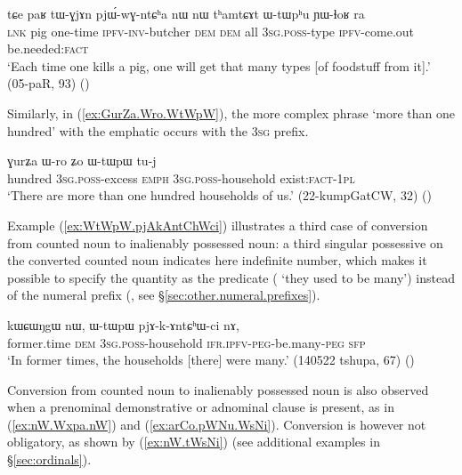 \begin{exe}
\ex \label{ex:nW.thamtCAt.WtWphu}
\gll tɕe paʁ tɯ-ɣjɤn pjɯ́-wɣ-ntɕʰa nɯ nɯ tʰamtɕɤt ɯ-tɯpʰu ɲɯ-ɬoʁ ra \\ 
 \textsc{lnk} pig one-time \textsc{ipfv}-\textsc{inv}-butcher \textsc{dem} \textsc{dem} all \textsc{3sg}.\textsc{poss}-type \textsc{ipfv}-come.out be.needed:\textsc{fact} \\
\glt `Each time one kills a pig, one will get that many types [of foodstuff from it].' (05-paR, 93)
()
\end{exe}

Similarly, in (\ref{ex:GurZa.Wro.WtWpW}), the more complex phrase  `more than one hundred' with the emphatic  occurs with the \textsc{3sg} prefix.

\begin{exe}
\ex \label{ex:GurZa.Wro.WtWpW}
\gll ɣurʑa ɯ-ro ʑo ɯ-tɯpɯ tu-j \\
 hundred \textsc{3sg}.\textsc{poss}-excess \textsc{emph} \textsc{3sg}.\textsc{poss}-household exist:\textsc{fact}-\textsc{1pl} \\
\glt `There are more than one hundred households of us.' (22-kumpGatCW, 32)
()
\end{exe}

Example (\ref{ex:WtWpW.pjAkAntChWci}) illustrates a third case of conversion from counted noun to inalienably possessed noun: a third singular possessive on the converted counted noun indicates here indefinite number, which makes it possible to specify the quantity as the predicate ( `they used to be many') instead of the numeral prefix (, see §\ref{sec:other.numeral.prefixes}).

\begin{exe}
\ex \label{ex:WtWpW.pjAkAntChWci}
\gll kɯɕɯŋgɯ nɯ, ɯ-tɯpɯ pjɤ-k-ɤntɕʰɯ-ci nɤ, \\
 former.time \textsc{dem} \textsc{3sg}.\textsc{poss}-household \textsc{ifr}.\textsc{ipfv}-\textsc{peg}-be.many-\textsc{peg} \textsc{sfp} \\
\glt `In former times, the households [there] were many.' (140522 tshupa, 67)
()
\end{exe}

Conversion from counted noun to inalienably possessed noun is also observed when a prenominal demonstrative or adnominal clause is present, as in (\ref{ex:nW.Wxpa.nW}) and (\ref{ex:arCo.pWNu.WsNi}). Conversion is however not obligatory, as shown by (\ref{ex:nW.tWsNi}) (see additional examples in §\ref{sec:ordinals}).

